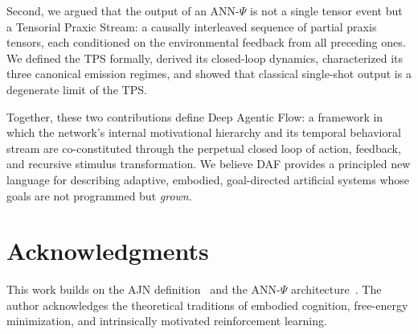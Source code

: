 \documentclass[12pt,a4paper]{article}
\begin{document}
Second, we argued that the output of an ANN-$\Psi$ is not a single tensor event
but a Tensorial Praxic Stream: a causally interleaved sequence of partial praxis
tensors, each conditioned on the environmental feedback from all preceding ones.
We defined the TPS formally, derived its closed-loop dynamics, characterized its
three canonical emission regimes, and showed that classical single-shot output is
a degenerate limit of the TPS.

Together, these two contributions define Deep Agentic Flow: a framework in which
the network's internal motivational hierarchy and its temporal behavioral stream
are co-constituted through the perpetual closed loop of action, feedback, and
recursive stimulus transformation. We believe DAF provides a principled new
language for describing adaptive, embodied, goal-directed artificial systems
whose goals are not programmed but \textit{grown}.

\section*{Acknowledgments}

This work builds on the AJN definition~\cite{tapiador2024ajn} and the
ANN-$\Psi$ architecture~\cite{tapiador2024annpsi}. The author acknowledges the
theoretical traditions of embodied cognition, free-energy minimization, and
intrinsically motivated reinforcement learning.
\end{document}
